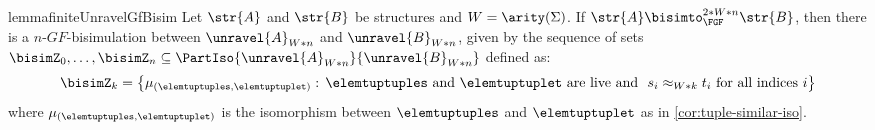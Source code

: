 \ifmainpart
\begin{restatable}{lemma}{finiteUnravelGfBisim}\label{lem:finite-unravel-gf-bisim}
  Let $\str{A}$ and $\str{B}$ be structures and $W = \arity(\Sigma)$.
  If $\str{A} \bisimto_{\FGF}^{2 * W * n} \str{B}$, then there is a $n$-$GF$-bisimulation between $\unravel{A}_{W * n}$ and $\unravel{B}_{W * n}$, given by the sequence of sets $\bisimZ_{0}, \ldots, \bisimZ_{n} \subseteq \PartIso{\unravel{A}_{W * n}}{\unravel{B}_{W * n}}$ defined as:
  \begin{equation*}
    \bisimZ_{k} = \left\{
      \mu_{(\elemtuptuples, \elemtuptuplet)}:\,
      \elemtuptuples\ \text{and}\ \elemtuptuplet\ \text{are live and}\ \
      s_{i} \approx_{W * k} t_{i}\ \text{for all indices $i$}
    \right\}
  \end{equation*}
  where $\mu_{(\elemtuptuples, \elemtuptuplet)}$ is the isomorphism between $\elemtuptuples$ and $\elemtuptuplet$ as in \cref{cor:tuple-similar-iso}.
\end{restatable}
\else
